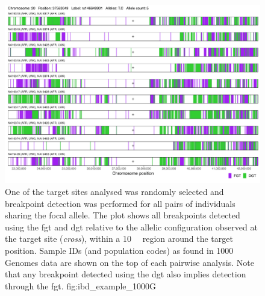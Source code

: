 

\begin{figure}[!htbp]
\includegraphics[width=\textwidth]{./img/ch3/ibd_example_1000G}
{One of the target sites analysed was randomly selected and breakpoint detection was performed for all pairs of individuals sharing the focal allele.
The plot shows all breakpoints detected using the \gls{fgt} and \gls{dgt} relative to the allelic configuration observed at the target site (\emph{cross}), within a \SI{10}{\mega\basepair} region around the target position.
Sample IDs (and population codes) as found in 1000 Genomes data are shown on the top of each pairwise analysis.
Note that any breakpoint detected using the \gls{dgt} also implies detection through the \gls{fgt}.}
{fig:ibd_example_1000G}
\end{figure}
